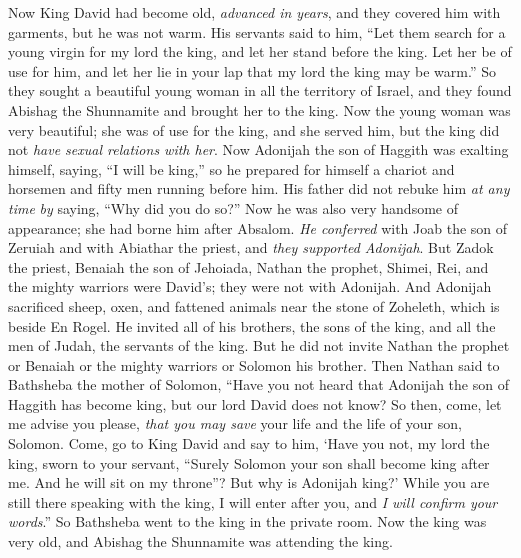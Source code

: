 
\begin{biblechapter} %
 Now King David had become old, \textit{advanced in years}, and they covered him with garments, but he was not warm.
\verse His servants said to him, “Let them search for a young virgin for my lord the king, and let her stand before the king. Let her be of use for him, and let her lie in your lap that my lord the king may be warm.”
\verse So they sought a beautiful young woman in all the territory of Israel, and they found Abishag the Shunnamite and brought her to the king.
\verse Now the young woman was very beautiful; she was of use for the king, and she served him, but the king did not \textit{have sexual relations with her}.
 Now Adonijah the son of Haggith was exalting himself, saying, “I will be king,” so he prepared for himself a chariot and horsemen and fifty men running before him.
\verse His father did not rebuke him \textit{at any time} \textit{by} saying, “Why did you do so?” Now he was also very handsome of appearance; she had borne him after Absalom.
\verse \textit{He conferred} with Joab the son of Zeruiah and with Abiathar the priest, and \textit{they supported Adonijah}.
\verse But Zadok the priest, Benaiah the son of Jehoiada, Nathan the prophet, Shimei, Rei, and the mighty warriors were David’s; they were not with Adonijah.
\verse And Adonijah sacrificed sheep, oxen, and fattened animals near the stone of Zoheleth, which is beside En Rogel. He invited all of his brothers, the sons of the king, and all the men of Judah, the servants of the king.
\verse But he did not invite Nathan the prophet or Benaiah or the mighty warriors or Solomon his brother.
 Then Nathan said to Bathsheba the mother of Solomon, “Have you not heard that Adonijah the son of Haggith has become king, but our lord David does not know?
\verse So then, come, let me advise you please, \textit{that you may save} your life and the life of your son, Solomon.
\verse Come, go to King David and say to him, ‘Have you not, my lord the king, sworn to your servant, “Surely Solomon your son shall become king after me. And he will sit on my throne”? But why is Adonijah king?’
\verse While you are still there speaking with the king, I will enter after you, and \textit{I will confirm your words}.”
\verse So Bathsheba went to the king in the private room. Now the king was very old, and Abishag the Shunnamite was attending the king.

\end{biblechapter}
